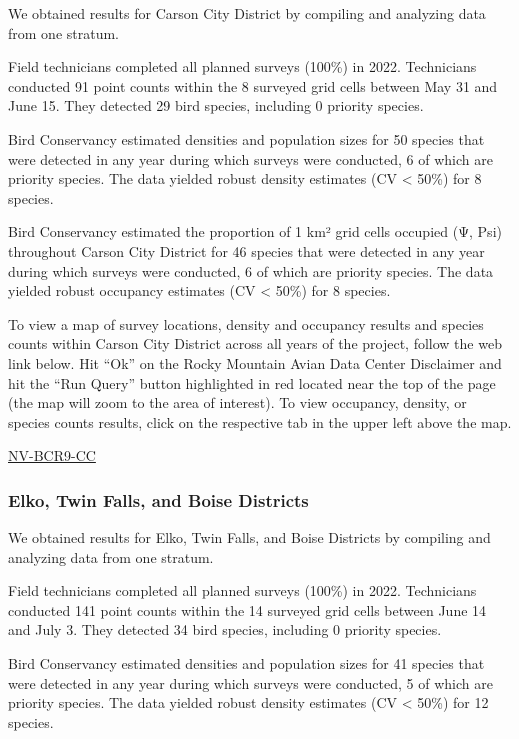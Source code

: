 \documentclass[
  letterpaper,
  DIV=11,
  numbers=noendperiod,
  oneside]{scrreprt}
\begin{document}
We obtained results for Carson City District by compiling and analyzing
data from one stratum.

Field technicians completed all planned surveys (100\%) in 2022.
Technicians conducted 91 point counts within the 8 surveyed grid cells
between May 31 and June 15. They detected 29 bird species, including 0
priority species.

Bird Conservancy estimated densities and population sizes for 50 species
that were detected in any year during which surveys were conducted, 6 of
which are priority species. The data yielded robust density estimates
(CV \textless{} 50\%) for 8 species.

Bird Conservancy estimated the proportion of 1 km² grid cells occupied
(Ψ, Psi) throughout Carson City District for 46 species that were
detected in any year during which surveys were conducted, 6 of which are
priority species. The data yielded robust occupancy estimates (CV
\textless{} 50\%) for 8 species.

To view a map of survey locations, density and occupancy results and
species counts within Carson City District across all years of the
project, follow the web link below. Hit ``Ok'' on the Rocky Mountain
Avian Data Center Disclaimer and hit the ``Run Query'' button
highlighted in red located near the top of the page (the map will zoom
to the area of interest). To view occupancy, density, or species counts
results, click on the respective tab in the upper left above the map.

\href{http://www.rmbo.org/new_site/adc/QueryWindow.aspx\#N4IgzgLgTghhCuBbEAuABCAcgNQLQCEBhAJQE5dDD194oBTGeNAewDM0AZGAOwBM0AsjxgBzOojrcIaXGkIwoYZtzkBLCAE80AEVWQoqgMYQQAXyA===}{NV-BCR9-CC}

\hypertarget{elko-twin-falls-and-boise-districts}{%
\subsubsection{Elko, Twin Falls, and Boise
Districts}\label{elko-twin-falls-and-boise-districts}}

We obtained results for Elko, Twin Falls, and Boise Districts by
compiling and analyzing data from one stratum.

Field technicians completed all planned surveys (100\%) in 2022.
Technicians conducted 141 point counts within the 14 surveyed grid cells
between June 14 and July 3. They detected 34 bird species, including 0
priority species.

Bird Conservancy estimated densities and population sizes for 41 species
that were detected in any year during which surveys were conducted, 5 of
which are priority species. The data yielded robust density estimates
(CV \textless{} 50\%) for 12 species.
\end{document}
